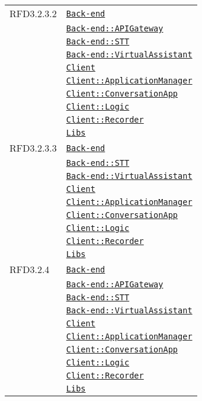 \begin{longtable}{|>{\centering}m{3cm}|m{10cm}<{\centering}|}
RFD3.2.3.2 & \hyperref[Back-end]{\texttt{Back-end}}\\
& \hyperref[Back-end::APIGateway]{\texttt{Back-end::APIGateway}}\\
& \hyperref[Back-end::STT]{\texttt{Back-end::STT}}\\
& \hyperref[Back-end::VirtualAssistant]{\texttt{Back-end::VirtualAssistant}}\\
& \hyperref[Client]{\texttt{Client}}\\
& \hyperref[Client::ApplicationManager]{\texttt{Client::ApplicationManager}}\\
& \hyperref[Client::ConversationApp]{\texttt{Client::ConversationApp}}\\
& \hyperref[Client::Logic]{\texttt{Client::Logic}}\\
& \hyperref[Client::Recorder]{\texttt{Client::Recorder}}\\
& \hyperref[Libs]{\texttt{Libs}}\\ \hline

RFD3.2.3.3 & \hyperref[Back-end]{\texttt{Back-end}}\\
& \hyperref[Back-end::STT]{\texttt{Back-end::STT}}\\
& \hyperref[Back-end::VirtualAssistant]{\texttt{Back-end::VirtualAssistant}}\\
& \hyperref[Client]{\texttt{Client}}\\
& \hyperref[Client::ApplicationManager]{\texttt{Client::ApplicationManager}}\\
& \hyperref[Client::ConversationApp]{\texttt{Client::ConversationApp}}\\
& \hyperref[Client::Logic]{\texttt{Client::Logic}}\\
& \hyperref[Client::Recorder]{\texttt{Client::Recorder}}\\
& \hyperref[Libs]{\texttt{Libs}}\\ \hline

RFD3.2.4 & \hyperref[Back-end]{\texttt{Back-end}}\\
& \hyperref[Back-end::APIGateway]{\texttt{Back-end::APIGateway}}\\
& \hyperref[Back-end::STT]{\texttt{Back-end::STT}}\\
& \hyperref[Back-end::VirtualAssistant]{\texttt{Back-end::VirtualAssistant}}\\
& \hyperref[Client]{\texttt{Client}}\\
& \hyperref[Client::ApplicationManager]{\texttt{Client::ApplicationManager}}\\
& \hyperref[Client::ConversationApp]{\texttt{Client::ConversationApp}}\\
& \hyperref[Client::Logic]{\texttt{Client::Logic}}\\
& \hyperref[Client::Recorder]{\texttt{Client::Recorder}}\\
& \hyperref[Libs]{\texttt{Libs}}\\ \hline


\end{longtable}
